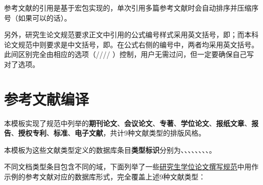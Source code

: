 \documentclass[print, doctor, vlined]{DissertUESTC}
\begin{document}
	参考文献的引用是基于宏包实现的，单次引用多篇参考文献时会自动排序并压缩序号（如果可以的话）。

	另外，研究生论文规范要求正文中引用的公式编号样式采用英文括号，即；而本科论文规范中则要求是中文括号，即。在公式右侧的编号中，两者均采用英文括号。此间区别完全由相应的选项（//// ）控制，用户无需过问，但一定要确保自己写对了选项。
	
	
	\section{参考文献编译}
	
	本模板实现了规范中列举的\textbf{期刊论文}、\textbf{会议论文}、\textbf{专著}、\textbf{学位论文}、\textbf{报纸文章}、\textbf{报告}、\textbf{授权专利}、\textbf{标准}、\textbf{电子文献}，共计9种文献类型的排版风格。
	
	本模板为这些文献类型定义的数据库条目\textbf{类型标识}分别为、、、、、、、、。
	
	不同文档类型条目包含不同的域，下面列举了一些\href{https://gr.uestc.edu.cn/xiazai/114/3917}{研究生学位论文撰写规范}中用作示例的参考文献对应的数据库形式，完全覆盖上述9种文献类型：
	
\end{document}

